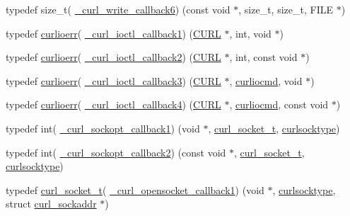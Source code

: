 \begin{DoxyCompactItemize}
\item 
typedef size\+\_\+t( \hyperlink{typecheck-gcc_8h_a7d38c5964bcf80455b4ac9fccb3bc4c3}{\+\_\+curl\+\_\+write\+\_\+callback6}) (const void $\ast$, size\+\_\+t, size\+\_\+t, F\+I\+LE $\ast$)
\item 
typedef \hyperlink{curl_8h_aed08c6203949f0b52a655e094f241920}{curlioerr}( \hyperlink{typecheck-gcc_8h_aac1891bdfef140df9bb64a06ed047fcc}{\+\_\+curl\+\_\+ioctl\+\_\+callback1}) (\hyperlink{curl_8h_ace655e3633b6533591283994d6b5cdda}{C\+U\+RL} $\ast$, int, void $\ast$)
\item 
typedef \hyperlink{curl_8h_aed08c6203949f0b52a655e094f241920}{curlioerr}( \hyperlink{typecheck-gcc_8h_afcf7a9e1d185d392c778b714db3112d1}{\+\_\+curl\+\_\+ioctl\+\_\+callback2}) (\hyperlink{curl_8h_ace655e3633b6533591283994d6b5cdda}{C\+U\+RL} $\ast$, int, const void $\ast$)
\item 
typedef \hyperlink{curl_8h_aed08c6203949f0b52a655e094f241920}{curlioerr}( \hyperlink{typecheck-gcc_8h_ae7c200fd4adb189b92a5373f59711ef8}{\+\_\+curl\+\_\+ioctl\+\_\+callback3}) (\hyperlink{curl_8h_ace655e3633b6533591283994d6b5cdda}{C\+U\+RL} $\ast$, \hyperlink{curl_8h_a3781556120d1f44d126ef1cf50019cf4}{curliocmd}, void $\ast$)
\item 
typedef \hyperlink{curl_8h_aed08c6203949f0b52a655e094f241920}{curlioerr}( \hyperlink{typecheck-gcc_8h_ab1a3806b61adfbc7040daf6f6d115f02}{\+\_\+curl\+\_\+ioctl\+\_\+callback4}) (\hyperlink{curl_8h_ace655e3633b6533591283994d6b5cdda}{C\+U\+RL} $\ast$, \hyperlink{curl_8h_a3781556120d1f44d126ef1cf50019cf4}{curliocmd}, const void $\ast$)
\item 
typedef int( \hyperlink{typecheck-gcc_8h_a32154ca77f61d2dec71eecd83f9416ca}{\+\_\+curl\+\_\+sockopt\+\_\+callback1}) (void $\ast$, \hyperlink{curl_8h_adb5a46d02359d2379dc7e0904c987828}{curl\+\_\+socket\+\_\+t}, \hyperlink{curl_8h_ae319cab849319fca1b222de282506ad9}{curlsocktype})
\item 
typedef int( \hyperlink{typecheck-gcc_8h_ababbf83b9d0907aa6938998a4bf0b6b8}{\+\_\+curl\+\_\+sockopt\+\_\+callback2}) (const void $\ast$, \hyperlink{curl_8h_adb5a46d02359d2379dc7e0904c987828}{curl\+\_\+socket\+\_\+t}, \hyperlink{curl_8h_ae319cab849319fca1b222de282506ad9}{curlsocktype})
\item 
typedef \hyperlink{curl_8h_adb5a46d02359d2379dc7e0904c987828}{curl\+\_\+socket\+\_\+t}( \hyperlink{typecheck-gcc_8h_a3e4f955d1af288f560f2cad5991caa14}{\+\_\+curl\+\_\+opensocket\+\_\+callback1}) (void $\ast$, \hyperlink{curl_8h_ae319cab849319fca1b222de282506ad9}{curlsocktype}, struct \hyperlink{structcurl__sockaddr}{curl\+\_\+sockaddr} $\ast$)

\end{DoxyCompactItemize}
